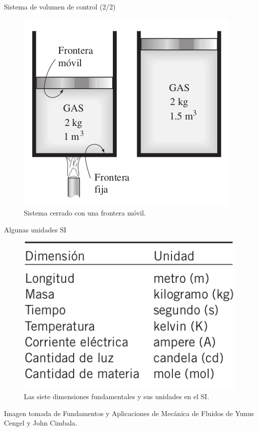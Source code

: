 \begin{frame}{Sistema de volumen de control (2/2)}
\justifying
\begin{figure}[H]
\centering
\includegraphics[scale=0.35]{Section_Files/imagenes/sec01_0101_Fig01-27.png}
\caption{Sistema cerrado con una frontera móvil.}
\label{fig: Figura1-27}
\end{figure}
\end{frame}




\begin{frame}{Algunas unidades SI}
\justifying
\begin{figure}[H]
\centering
\includegraphics[scale=0.35]{Section_Files/imagenes/sec01_0101_Fig01-Tabla-1-1.png}
\caption{Las siete dimensiones fundamentales y sus unidades en el SI.}
\label{fig: Figura1-Tabla-1-1}
\end{figure}
Imagen tomada de Fundamentos y Aplicaciones de Mecánica de Fluidos de Yunus Cengel y John Cimbala.
\end{frame}
	
